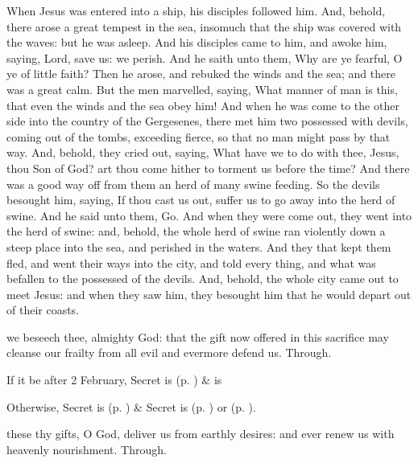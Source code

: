  When Jesus was entered into a ship, his disciples followed him. And, behold, there arose a great tempest in the sea, insomuch that the ship was covered with the waves: but he was asleep. And his disciples came to him, and awoke him, saying, Lord, save us: we perish. And he saith unto them, Why are ye fearful, O ye of little faith? Then he arose, and rebuked the winds and the sea; and there was a great calm. But the men marvelled, saying, What manner of man is this, that even the winds and the sea obey him! And when he was come to the other side into the country of the Gergesenes, there met him two possessed with devils, coming out of the tombs, exceeding fierce, so that no man might pass by that way. And, behold, they cried out, saying, What have we to do with thee, Jesus, thou Son of God? art thou come hither to torment us before the time? And there was a good way off from them an herd of many swine feeding. So the devils besought him, saying, If thou cast us out, suffer us to go away into the herd of swine. And he said unto them, Go. And when they were come out, they went into the herd of swine: and, behold, the whole herd of swine ran violently down a steep place into the sea, and perished in the waters. And they that kept them fled, and went their ways into the city, and told every thing, and what was befallen to the possessed of the devils. And, behold, the whole city came out to meet Jesus: and when they saw him, they besought him that he would depart out of their coasts.


\secret
{} we beseech thee, almighty God: that the gift now offered in this sacrifice may cleanse our frailty from all evil and evermore defend us. Through.
\begin{rubric}
    If it be after 2 February,  Secret is  (p. \pageref{SPSaints}) \&  is 
\end{rubric}
\begin{rubric}
	Otherwise,  Secret is  (p. \pageref{SPMaryPostChristmas}) \&  Secret is  (p. \pageref{SPAgainst}) or  (p. \pageref{SPChiefBishop}).
\end{rubric}
\postcommunion
{} these thy gifts, O God, deliver us from earthly desires: and ever renew us with heavenly nourishment. Through.

